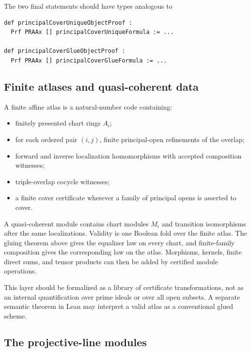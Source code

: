 The two final statements should have types analogous to
\begin{lstlisting}[language={}] 
def principalCoverUniqueObjectProof :
  Prf PRAAx [] principalCoverUniqueFormula := ...

def principalCoverGlueObjectProof :
  Prf PRAAx [] principalCoverGlueFormula := ...
\end{lstlisting}

\subsection{Finite atlases and quasi-coherent data}

A finite affine atlas is a natural-number code containing:
\begin{itemize}
\item finitely presented chart rings $A_i$;
\item for each ordered pair $(i,j)$, finite principal-open refinements of the overlap;
\item forward and inverse localization homomorphisms with accepted composition witnesses;
\item triple-overlap cocycle witnesses;
\item a finite cover certificate wherever a family of principal opens is asserted to cover.
\end{itemize}
A quasi-coherent module contains chart modules $M_i$ and transition isomorphisms after the same
localizations.  Validity is one Boolean fold over the finite atlas.  The gluing theorem above gives
the equalizer law on every chart, and finite-family composition gives the corresponding law on the
atlas.  Morphisms, kernels, finite direct sums, and tensor products can then be added by certified
module operations.

This layer should be formalized as a library of certificate transformations, not as an internal
quantification over prime ideals or over all open subsets.  A separate semantic theorem in Lean may
interpret a valid atlas as a conventional glued scheme.

\subsection{The projective-line modules}

